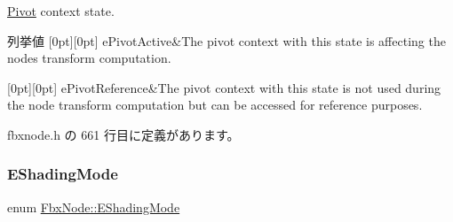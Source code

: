 \hyperlink{class_fbx_node_1_1_pivot}{Pivot} context state. \begin{DoxyEnumFields}{列挙値}
[0pt][0pt]{}\mbox{\label{class_fbx_node_a153fc75958227fc6728a2233b630b58aa3e58a6a13e3ace7a8df4e10d38e830ad}} 
e\+Pivot\+Active&The pivot context with this state is affecting the node\textquotesingle{}s transform computation. \\
\hline

[0pt][0pt]{}\mbox{\label{class_fbx_node_a153fc75958227fc6728a2233b630b58aa461fb50a03f81968c296135f74523bdd}} 
e\+Pivot\+Reference&The pivot context with this state is not used during the node transform computation but can be accessed for reference purposes. \\
\hline

\end{DoxyEnumFields}


 fbxnode.\+h の 661 行目に定義があります。

\mbox{\label{class_fbx_node_ab65aa5e41d10dfb4c887667c9a56019d}} 
\subsubsection{\texorpdfstring{E\+Shading\+Mode}{EShadingMode}}
{\footnotesize\ttfamily enum \hyperlink{class_fbx_node_ab65aa5e41d10dfb4c887667c9a56019d}{Fbx\+Node\+::\+E\+Shading\+Mode}}

